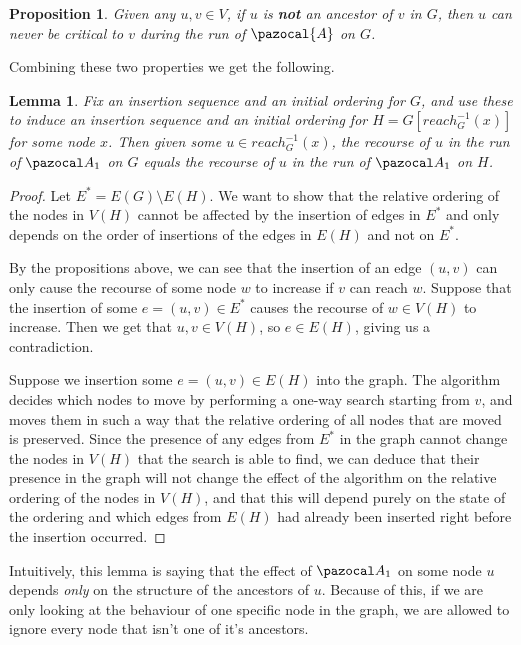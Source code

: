 \documentclass{report}
\newtheorem{lemma}[theorem]{Lemma}
\newtheorem{proposition}[theorem]{Proposition}
\begin{document}
\begin{proposition}
Given any $u,v \in V$, if $u$ is \textbf{not} an ancestor of $v$ in $G$, then $u$ can never be critical to $v$ during the run of $\pazocal{A}$ on $G$. 
\end{proposition}

Combining these two properties we get the following.

\begin{lemma}
Fix an insertion sequence and an initial ordering for $G$, and use these to induce an insertion sequence and an initial ordering for $H = G[reach^{-1}_{G}(x)]$ for some node $x$. Then given some $u \in reach^{-1}_{G}(x)$, the recourse of $u$ in the run of $\pazocal A_1$ on $G$ equals the recourse of $u$ in the run of $\pazocal A_1$ on $H$.
\end{lemma}

\begin{proof}
Let $E^* = E(G) \setminus E(H)$. We want to show that the relative ordering of the nodes in $V(H)$ cannot be affected by the insertion of edges in $E^*$ and only depends on the order of insertions of the edges in $E(H)$ and not on $E^*$.

By the propositions above, we can see that the insertion of an edge $(u,v)$ can only cause the recourse of some node $w$ to increase if $v$ can reach $w$. Suppose that the insertion of some $e = (u,v) \in E^*$ causes the recourse of $w \in V(H)$ to increase. Then we get that $u,v \in V(H)$, so $e \in E(H)$, giving us a contradiction.

Suppose we insertion some $e = (u,v) \in E(H)$ into the graph. The algorithm decides which nodes to move by performing a one-way search starting from $v$, and moves them in such a way that the relative ordering of all nodes that are moved is preserved. Since the presence of any edges from $E^*$ in the graph cannot change the nodes in $V(H)$ that the search is able to find, we can deduce that their presence in the graph will not change the effect of the algorithm on the relative ordering of the nodes in $V(H)$, and that this will depend purely on the state of the ordering and which edges from $E(H)$ had already been inserted right before the insertion occurred.
\end{proof}

Intuitively, this lemma is saying that the effect of $\pazocal A_1$ on some node $u$ depends \textit{only} on the structure of the ancestors of $u$. Because of this, if we are only looking at the behaviour of one specific node in the graph, we are allowed to ignore every node that isn't one of it's ancestors.
\end{document}
